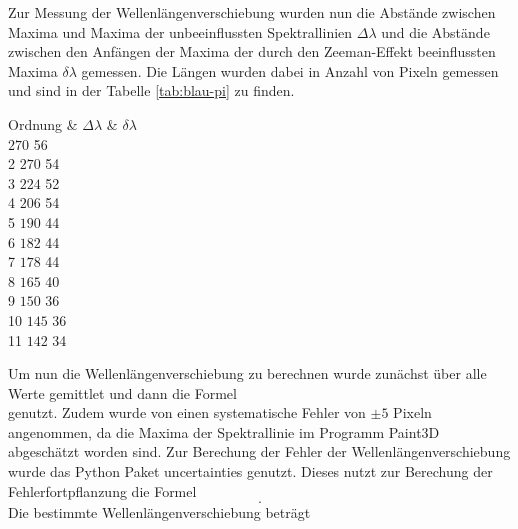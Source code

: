 Zur Messung der Wellenlängenverschiebung wurden nun die Abstände zwischen Maxima und Maxima der unbeeinflussten Spektrallinien $\Delta \lambda$
und die Abstände zwischen den Anfängen der Maxima der durch den Zeeman-Effekt beeinflussten Maxima $\delta \lambda$ gemessen.
Die Längen wurden dabei in Anzahl von Pixeln gemessen und sind in der Tabelle \ref{tab:blau-pi} zu finden.

\begin{table}
    \centering
    \caption{Die Abstände der Maxima der Spektrallinien in Anzahl von Pixel.
    $\Delta \lambda$ gibt dabei die unbeeinflussten Abstände und $\delta \lambda$ die durch den Zeeman-Effekt beeinflussten Abstände, des $\pi -$ Polarisirtem Lichts an.}
    \begin{tabular}
        \toprule
        Ordnung & $\Delta \lambda$ & $\delta \lambda $  \\
          $    270 $   56  \\
        2  $    270 $   54  \\
        3  $    224 $   52  \\
        4  $    206 $   54  \\
        5  $    190 $   44  \\
        6  $    182 $   44  \\
        7  $    178 $   44  \\
        8  $    165 $   40  \\
        9  $    150 $   36  \\
        10 $    145 $   36  \\
        11 $    142 $   34  \\
    \end{tabular}
    \label{tab:blau-pi}
\end{table}

Um nun die Wellenlängenverschiebung zu berechnen wurde zunächst über alle Werte gemittlet und dann die Formel
\begin{equation}

    \label{eq:Wellenlängenverschiebung}
\end{equation}
genutzt.
Zudem wurde von einen systematische Fehler von $\pm 5$ Pixeln angenommen, da die Maxima der Spektrallinie im Programm Paint3D \cite{paint3d} abgeschätzt worden sind.
Zur Berechung der Fehler der Wellenlängenverschiebung wurde das Python Paket uncertainties \cite{uncertainties} genutzt.
Dieses nutzt zur Berechung der Fehlerfortpflanzung die Formel
\begin{equation}
    .
    \label{eq:fehler_Wellenlängenverschiebung}
\end{equation}
Die bestimmte Wellenlängenverschiebung beträgt


